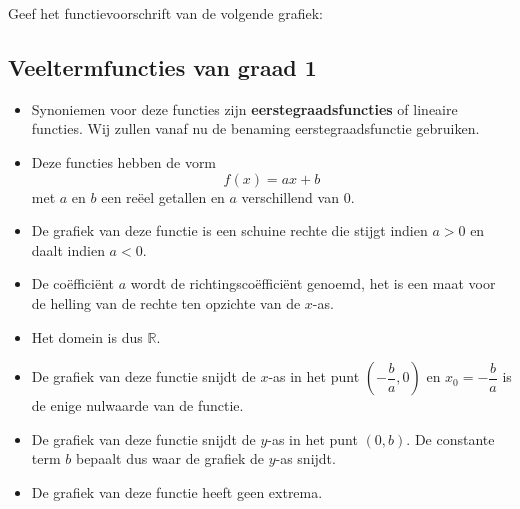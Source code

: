 \documentclass[12pt]{article}
\begin{document}
\begin{oefening}
  Geef het functievoorschrift van de volgende grafiek:
  \begin{center}
  \end{center}
\end{oefening}

\begin{theorie}

\pagebreak
\subsection{Veeltermfuncties van graad 1}

\begin{itemize}
\item Synoniemen voor deze functies zijn {\bf eerstegraadsfuncties} of lineaire functies. Wij zullen vanaf nu de benaming eerstegraadsfunctie gebruiken.
\item Deze functies hebben de vorm
  $$f(x) = ax+b $$
  met $a$ en $b$ een reëel getallen en $a$ verschillend van $0$.
\item De grafiek van deze functie is een schuine rechte die stijgt indien $a > 0$ en daalt indien $a<0$.
\item De coëfficiënt $a$ wordt de richtingscoëfficiënt genoemd, het is een maat voor de helling van de rechte ten opzichte van de $x$-as.
\item Het domein is dus $\mathbb{R}$.
\item De grafiek van deze functie snijdt de $x$-as in het punt $(-\dfrac{b}{a}, 0)$ en $x_0=-\dfrac{b}{a}$ is de enige nulwaarde van de functie.
\item De grafiek van deze functie snijdt de $y$-as in het punt $(0, b)$. De constante term $b$ bepaalt dus waar de grafiek de $y$-as snijdt.
\item De grafiek van deze functie heeft geen extrema.
\end{itemize}

\end{theorie}
\end{document}
